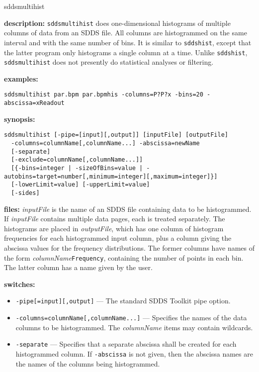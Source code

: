 \begin{sddsprog}{sddsmultihist}
  \item \textbf{description:} \verb|sddsmultihist| does one-dimensional histograms of multiple columns of data from an SDDS file.
    All columns are histogrammed on the same interval and with the same number of bins. It is similar to \verb|sddshist|,
    except that the latter program only histograms a single column at a time. Unlike \verb|sddshist|, \verb|sddsmultihist|
    does not presently do statistical analyses or filtering.
  \item \textbf{examples:}
    \begin{verbatim}
sddsmultihist par.bpm par.bpmhis -columns=P?P?x -bins=20 -abscissa=xReadout
    \end{verbatim}
  \item \textbf{synopsis:}
    \begin{verbatim}
sddsmultihist [-pipe=[input][,output]] [inputFile] [outputFile]
  -columns=columnName[,columnName...] -abscissa=newName
  [-separate]
  [-exclude=columnName[,columnName...]]
  [{-bins=integer | -sizeOfBins=value | -autobins=target=number[,minimum=integer][,maximum=integer]}]
  [-lowerLimit=value] [-upperLimit=value]
  [-sides]
    \end{verbatim}
  \item \textbf{files:} \emph{inputFile} is the name of an SDDS file containing data to be histogrammed. If \emph{inputFile}
    contains multiple data pages, each is treated separately. The histograms are placed in \emph{outputFile}, which has one
    column of histogram frequencies for each histogrammed input column, plus a column giving the abscissa values for the frequency
    distributions. The former columns have names of the form \emph{columnName}\verb|Frequency|, containing the number of points
    in each bin. The latter column has a name given by the user.
  \item \textbf{switches:}
    \begin{itemize}
      \item \verb|-pipe[=input][,output]| --- The standard SDDS Toolkit pipe option.
      \item \verb|-columns=columnName[,columnName...]| --- Specifies the names of the data columns to be histogrammed. The
        \emph{columnName} items may contain wildcards.
      \item \verb|-separate| --- Specifies that a separate abscissa shall be created for each histogrammed column. If
        \verb|-abscissa| is not given, then the abscissa names are the names of the columns being histogrammed.

\end{itemize}
\end{sddsprog}

